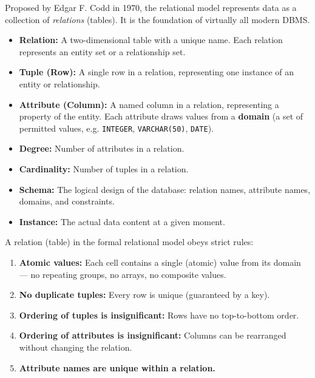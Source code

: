 \documentclass[11pt]{article}
\newcounter{popsec}
\newcounter{popsub}
\newcommand{\courssub}[1]{%
  \stepcounter{popsub}%
  \par\vspace{9pt}\noindent{\popxbold\fontsize{11.5}{13}\selectfont\color{popink}{\color{poporange}\thepopsec.\thepopsub}\hspace{6pt}#1}\par\nopagebreak\vspace{4pt}
}
\begin{document}
\courssub{The Relational Model}

Proposed by Edgar F. Codd in 1970, the relational model represents data as a collection of \emph{relations} (tables). It is the foundation of virtually all modern DBMS.

\begin{definition}
\begin{itemize}
    \item \textbf{Relation:} A two-dimensional table with a unique name. Each relation represents an entity set or a relationship set.
    \item \textbf{Tuple (Row):} A single row in a relation, representing one instance of an entity or relationship.
    \item \textbf{Attribute (Column):} A named column in a relation, representing a property of the entity. Each attribute draws values from a \textbf{domain} (a set of permitted values, e.g. \texttt{INTEGER}, \texttt{VARCHAR(50)}, \texttt{DATE}).
    \item \textbf{Degree:} Number of attributes in a relation.
    \item \textbf{Cardinality:} Number of tuples in a relation.
    \item \textbf{Schema:} The logical design of the database: relation names, attribute names, domains, and constraints.
    \item \textbf{Instance:} The actual data content at a given moment.
\end{itemize}
\end{definition}

\begin{propriete}
A relation (table) in the formal relational model obeys strict rules:
\begin{enumerate}
    \item \textbf{Atomic values:} Each cell contains a single (atomic) value from its domain — no repeating groups, no arrays, no composite values.
    \item \textbf{No duplicate tuples:} Every row is unique (guaranteed by a key).
    \item \textbf{Ordering of tuples is insignificant:} Rows have no top-to-bottom order.
    \item \textbf{Ordering of attributes is insignificant:} Columns can be rearranged without changing the relation.
    \item \textbf{Attribute names are unique within a relation.}
\end{enumerate}
\end{propriete}
\end{document}
